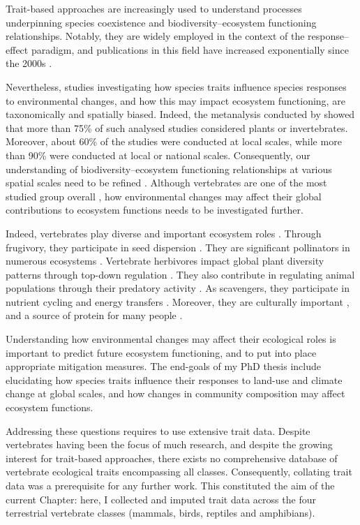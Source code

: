 Trait-based approaches are increasingly used to understand processes underpinning species coexistence and biodiversity--ecosystem functioning relationships. Notably, they are widely employed in the context of the response--effect paradigm, and publications in this field have increased exponentially since the 2000s \citep{Hevia2017}. 

Nevertheless, studies investigating how species traits influence species responses to environmental changes, and how this may impact ecosystem functioning, are taxonomically and spatially biased\citep{Hevia2017}. Indeed, the metanalysis conducted by \citet{Hevia2017} showed that more than 75\% of such analysed studies considered plants or invertebrates. Moreover, about 60\% of the studies were conducted at local scales, while more than 90\% were conducted at local or national scales. Consequently, our understanding of biodiversity--ecosystem functioning relationships at various spatial scales need to be refined \citep{Thompson2018, Isbell2018}. Although vertebrates are one of the most studied group overall \citep{Titley2017}, how environmental changes may affect their global contributions to ecosystem functions needs to be investigated further. 

Indeed, vertebrates play diverse and important ecosystem roles \citep{Sekercioglu2006,Hocking2014,Severtsov2013}. Through frugivory, they  participate in seed dispersion \citep{Wandrag2015, Mokany2014, McConkey2012}. They are significant pollinators in numerous ecosystems \citep{Ratto2018}. Vertebrate herbivores impact global plant diversity patterns through top-down regulation \citep{Lin2018, Zhang2018}. They also contribute in regulating animal populations through their predatory activity \citep{Paine2016, Luck2012, Letnic2012, Salo2010, Barber2010}. As scavengers, they participate in nutrient cycling and energy transfers \citep{Cunningham2018, Inger2016, Wilson2011}. Moreover, they are culturally important \citep{Hirons2016, Albert2018}, and a source of protein for many people \citep{Alves2018}.

Understanding how environmental changes may affect their ecological roles is important to predict future ecosystem functioning, and to put into place appropriate mitigation measures. The end-goals of my PhD thesis include elucidating how species traits influence their responses to land-use and climate change at global scales, and how changes in community composition may affect ecosystem functions.

Addressing these questions requires to use extensive trait data. Despite vertebrates having been the focus of much research, and despite the growing interest for trait-based approaches, there exists no comprehensive database of vertebrate ecological traits encompassing all classes. Consequently, collating trait data was a prerequisite for any further work. This constituted the aim of the current Chapter: here, I collected and imputed trait data across the four terrestrial vertebrate classes (mammals, birds, reptiles and amphibians).

